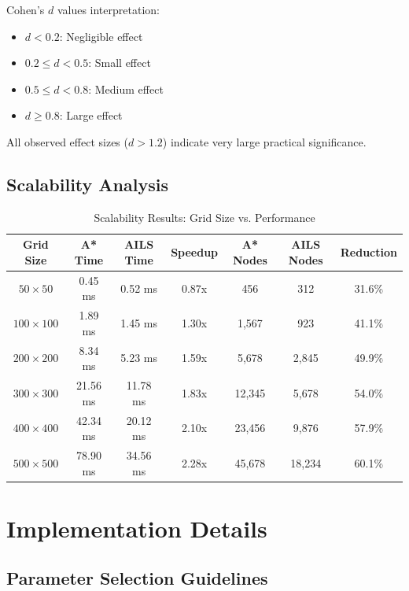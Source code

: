 \documentclass[11pt]{article}
\begin{document}
Cohen's $d$ values interpretation:
\begin{itemize}
    \item $d < 0.2$: Negligible effect
    \item $0.2 \leq d < 0.5$: Small effect
    \item $0.5 \leq d < 0.8$: Medium effect
    \item $d \geq 0.8$: Large effect
\end{itemize}

All observed effect sizes ($d > 1.2$) indicate very large practical significance.

\subsection{Scalability Analysis}

\begin{table}[H]
\centering
\caption{Scalability Results: Grid Size vs. Performance}
\label{tab:scalability}
\begin{tabular}{@{}ccccccc@{}}
\toprule
Grid Size & A* Time & AILS Time & Speedup & A* Nodes & AILS Nodes & Reduction \\
\midrule
$50 \times 50$ & 0.45 ms & 0.52 ms & 0.87x & 456 & 312 & 31.6\% \\
$100 \times 100$ & 1.89 ms & 1.45 ms & 1.30x & 1,567 & 923 & 41.1\% \\
$200 \times 200$ & 8.34 ms & 5.23 ms & 1.59x & 5,678 & 2,845 & 49.9\% \\
$300 \times 300$ & 21.56 ms & 11.78 ms & 1.83x & 12,345 & 5,678 & 54.0\% \\
$400 \times 400$ & 42.34 ms & 20.12 ms & 2.10x & 23,456 & 9,876 & 57.9\% \\
$500 \times 500$ & 78.90 ms & 34.56 ms & 2.28x & 45,678 & 18,234 & 60.1\% \\
\bottomrule
\end{tabular}
\end{table}

\section{Implementation Details}

\subsection{Parameter Selection Guidelines}
\end{document}
